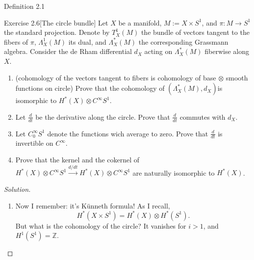 \begin{thing3}{Definition 2.1}
\begin{thing4}{Exercise 2.6}[The circle bundle]\label{exer:2.6}\leavevmode
Let \(X\) be a manifold, \(M:=X \times S^1\), and \(\pi:M \to S^1\) the standard projection. Denote by \(T^1_X(M)\) the bundle of vectors tangent to the fibers of \(\pi\), \(\Lambda^{1}_X(M)\) its dual, and \(\Lambda^{*}_X(M)\) the corresponding Grassmann algebra. Consider the de Rham differential \(d_X\) acting on \(\Lambda^{*}_X(M)\) fiberwise along \(X\).

\begin{enumerate}[label=(\alph*)]
\item {\color{6}(cohomology of the vectors tangent to fibers is cohomology of base \(\otimes\) smooth functions on circle)} Prove that the cohomology of \((\Lambda^{*}_X(M),d_X)\)is isomorphic to \(H^{*}(X)\otimes C^\infty S^1\).
\item Let \(\frac{d}{dt}\) be the derivative along the circle. Prove that \(\frac{d}{dt}\) commutes with \(d_X\).
\item Let \(C^\infty_0S^1\) denote the functions wich average to zero. Prove that \(\frac{d}{dt}\) is invertible on \(C^\infty\).
\item Prove that the kernel and the cokernel of \(H^{*}(X)\otimes C^\infty S^1\xrightarrow{d/dt}H^{*}(X)\otimes C^\infty S^1\) are naturally isomorphic to \(H^{*}(X)\).
\end{enumerate}
\end{thing4}

\begin{proof}[Solution]\leavevmode
\begin{enumerate}
\item 
	\iffalse Right so a form \(\alpha\) of the circle bundle is a linear operator on \(TM\). So what is \(TM\). It is a point and a vector, so \((p,e^{it}) \in X \times S^1\) and \((v,r)\in TX \oplus TS^1\). And \(\alpha\) will map \((v,r)\), or some tuple of vectors, to a number.

	I would like to have an expression for \(\alpha\) decomposed as a form on \(X\) and a form on \(S^1\). Well, just as \(T(M)=T(X) \oplus  T(S^1)\) we should have \(T^*(M)=T^*(X)\oplus T^*(S^1)\). And immediately we get that \(\alpha = \omega \oplus \eta\).

	So the cohomology class of \(\alpha\), if it is closed, …
\fi
	Now I  remember: it's Künneth formula! As I recall,
	\[H^*(X \times S^1)=H^{*}(X) \otimes H^*(S^1).\]
But what is the cohomology of the circle? It vanishes for \(i>1\), and \(H^1(S^1)=\mathbb{Z}\).


\end{enumerate}
\end{proof}
\end{thing3}
